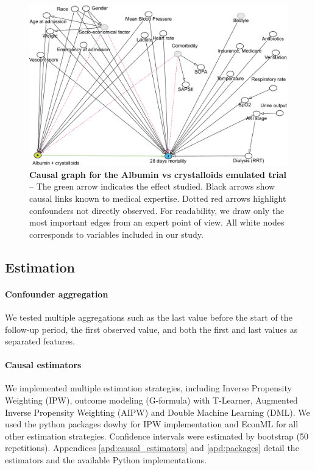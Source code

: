 \documentclass[french,12pt,twoside,a4paper]{book}
\begin{document}
\begin{figure}[t!]
  \centering%
  \includegraphics[width=.9\linewidth]{img/chapter_4/dagitty_graph.pdf}
  \caption{\textbf{Causal graph for the Albumin vs crystalloids emulated
      trial} -- The
    green arrow indicates the effect studied. Black arrows show causal links
    known to medical expertise. Dotted red arrows highlight confounders not directly
    observed. For readability, we draw only the most important edges from an
    expert point of view. All white nodes corresponds to variables included in
    our study.}\label{fig:causal_diagram_albumin}
\end{figure}


\subsection{Estimation}\label{subsec:causal_tuto:estimation_mimic}

\paragraph{Confounder aggregation}

We tested multiple aggregations such as the last value before the start of the
follow-up period, the first observed value, and both the first and last values as
separated features.

\paragraph{Causal estimators}

We implemented multiple estimation strategies, including Inverse Propensity
Weighting (IPW), outcome modeling (G-formula) with T-Learner, Augmented Inverse
Propensity Weighting (AIPW) and Double Machine Learning (DML). We used the
python packages dowhy \citep{sharma2018tutorial} for IPW implementation and
EconML \citep{battocchi2019econml} for all other estimation strategies.
Confidence intervals were estimated by bootstrap (50 repetitions).
Appendices \ref{apd:causal_estimators} and
\ref{apd:packages} detail the estimators and the available Python
implementations.
\end{document}
